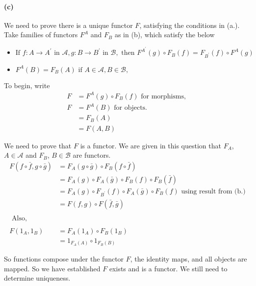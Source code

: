 \documentclass{article}
\begin{document}
\paragraph{(c)}

We need to prove there is a unique functor $F$, satisfying the conditions in (a.). Take families of functors $F^A$ and $F_B$ as in (b), which satisfy the below

\begin{itemize}
\item $ \text{If }f\colon A \rightarrow A^{\prime} \text{ in } \mathcal{A}, g\colon B \rightarrow B^{\prime} \text{ in } \mathcal{B}, \text{ then } F^{A^{\prime}}(g) \circ F_B(f) = F_{B^\prime}(f) \circ F^A(g)$
\item $F^A(B) = F_B(A) \text{ if } A \in \mathcal{A}, B \in \mathcal{B},$
\end{itemize}

To begin, write
\begin{align*}
  F &= F^A(g) \circ F_B(f) \text{ for morphisms, } \\
  F & =F^A(B) \text{ for objects. } \\
    & =F_B(A) \\
    & = F(A,B)
\end{align*}

We need to prove that $F$ is a functor. We are given in this question that $F_A$, $A \in \mathcal{A}$ and $F_B$, $B \in \mathcal{B}$ are functors.
\begin{align*}
  F(f \circ \bar{f}, g \circ \bar{g}) &= F_A(g \circ \bar{g}) \circ F_B(f \circ \bar{f}) \\
                                                &= F_A(g) \circ F_A(\bar{g}) \circ F_B(f) \circ F_B(\bar{f}) \\
                                                &= F_A(g) \circ F_{B^{\prime}}(f) \circ F_A(\bar{g}) \circ F_B(f) \text{ using result from (b.)} \\
                                      &= F(f,g) \circ F(\bar{f}, \bar{g}) \\ \\
  \text { Also, } \\\\
  F(1_A,1_B) &= F_A(1_A) \circ F_B(1_B) \\
             &= 1_{F_A(A)} \circ 1_{F_B(B)}
\end{align*}

So functions compose under the functor $F$, the identity maps, and all objects are mapped. So we have established $F$ exists and is a functor. We still need to determine uniqueness.
\end{document}
